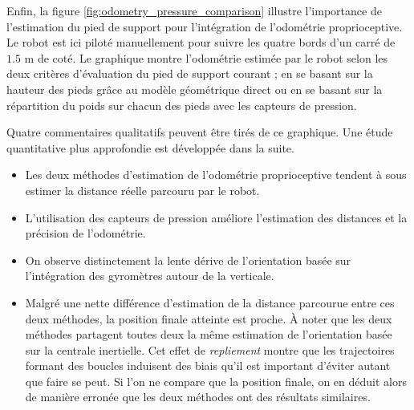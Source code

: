 Enfin, la figure \ref{fig:odometry_pressure_comparison} illustre l'importance de l'estimation
du pied de support pour l'intégration de l'odométrie proprioceptive. 
Le robot est ici piloté manuellement pour suivre les quatre bords d'un carré de $1.5$ m de coté.
Le graphique montre l'odométrie estimée par le robot selon les deux critères d'évaluation du
pied de support courant ; en se basant sur la hauteur des pieds grâce au modèle géométrique direct
ou en se basant sur la répartition du poids sur chacun des pieds avec les capteurs de pression.

Quatre commentaires qualitatifs peuvent être tirés de ce graphique.
Une étude quantitative plus approfondie est développée dans la suite.
\begin{itemize}
    \item Les deux méthodes d'estimation de l'odométrie proprioceptive 
        tendent à sous estimer la distance réelle parcouru par le robot.
    \item L'utilisation des capteurs de pression améliore l'estimation des distances et
        la précision de l'odométrie.
    \item On observe distinctement la lente dérive de l'orientation basée sur l'intégration
        des gyromètres autour de la verticale.
    \item Malgré une nette différence d'estimation de la distance parcourue entre ces deux
        méthodes, la position finale atteinte est proche. À noter que les deux méthodes partagent 
        toutes deux la même estimation de l'orientation basée sur la centrale inertielle.
        Cet effet de \textit{repliement} montre que les trajectoires formant des boucles
        induisent des biais qu'il est important d'éviter autant que faire se peut.
        Si l'on ne compare que la position finale, on en déduit alors de manière 
        erronée que les deux méthodes ont des résultats similaires.
\end{itemize}

